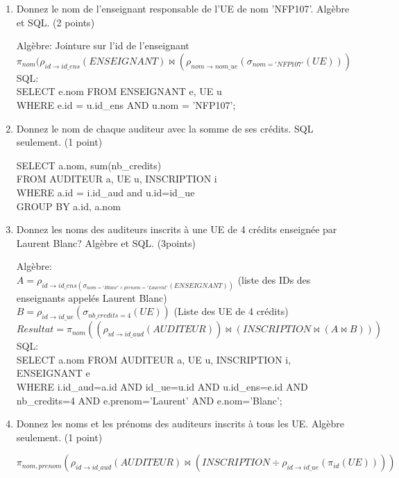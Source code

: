 \begin{enumerate}
  \item Donnez le nom de l'enseignant responsable de l'UE de nom 'NFP107'. Alg\`ebre et SQL. (2 points)
\begin{correction}
    Alg\`ebre: Jointure sur l'id de l'enseignant\\
    $\pi_{nom}(\rho_{id \rightarrow id\_ens}(ENSEIGNANT) \Join (\rho_{nom \rightarrow nom\_ue}(\sigma_{nom='NFP107'}(UE)))$\\
    SQL:\\
    SELECT e.nom FROM ENSEIGNANT e, UE u\\
    WHERE e.id = u.id\_ens AND u.nom = 'NFP107';\\
\end{correction}

  \item Donnez le nom de chaque auditeur avec la somme de ses cr\'edits. SQL seulement. (1 point)
\begin{correction}
  SELECT a.nom, sum(nb\_credits)\\
  FROM AUDITEUR a, UE u, INSCRIPTION i\\
  WHERE a.id = i.id\_aud and u.id=id\_ue\\
  GROUP BY a.id, a.nom
\end{correction}
  
  \item Donnez les noms des auditeurs inscrits à une UE de 4 cr\'edits enseign\'ee par Laurent Blanc? Alg\`ebre et SQL. (3points)
\begin{correction}
  Alg\`ebre:\\
	$A = \rho_{id \rightarrow id\_ens (\sigma_{nom='Blanc' \land prenom='Laurent'}(ENSEIGNANT))} $ (liste des IDs des enseignants appel\'es Laurent Blanc)\\
    $B = \rho_{id \rightarrow id\_ue}(\sigma_{nb\_credits=4}(UE))$ (Liste des UE de 4 cr\'edits)\\
    $Resultat = \pi_{nom}((\rho_{id \rightarrow id\_aud}(AUDITEUR)) \Join ( INSCRIPTION \Join (A \Join B)))$\\ 

   SQL:\\
    SELECT a.nom FROM AUDITEUR a, UE u, INSCRIPTION i, ENSEIGNANT e\\
    WHERE i.id\_aud=a.id AND id\_ue=u.id AND
          u.id\_ens=e.id AND nb\_credits=4 AND
          e.prenom='Laurent' AND e.nom='Blanc';
\end{correction}

  
  \item Donnez les noms et les pr\'enoms des auditeurs inscrits \`a tous les UE. Alg\`ebre seulement. (1 point)
\begin{correction}
  $\pi_{nom, prenom}(\rho_{id \rightarrow id\_aud}(AUDITEUR) \Join(INSCRIPTION \div \rho_{id \rightarrow id\_ue}(\pi_{id}(UE))))$
\end{correction}
  
\end{enumerate}
 
